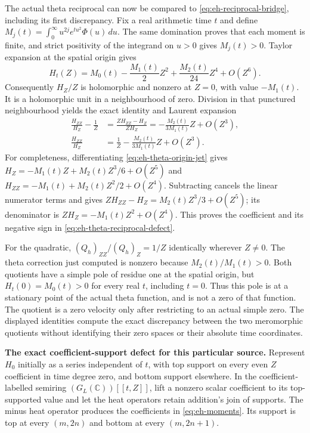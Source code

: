 \documentclass[11pt,a4paper]{article}
\theoremstyle{definition}\newtheorem{definition}[theorem]{Definition}
\begin{document}
The actual theta reciprocal can now be compared to
\eqref{eq:eh-reciprocal-bridge}, including its first discrepancy.
Fix a real arithmetic time $t$ and define
$M_j(t)=\int_0^\infty u^{2j}e^{tu^2}\Phi(u)\,du$. The same
domination proves that each moment is finite, and strict positivity
of the integrand on $u>0$ gives $M_j(t)>0$. Taylor expansion at
the spatial origin gives
\begin{equation}
 H_t(Z)=M_0(t)-\frac{M_1(t)}2Z^2
          +\frac{M_2(t)}{24}Z^4+O(Z^6).
 \label{eq:eh-theta-origin-jet}
\end{equation}
Consequently $H_Z/Z$ is holomorphic and nonzero at $Z=0$, with
value $-M_1(t)$. It is a holomorphic unit in a neighbourhood of
zero. Division in that punctured neighbourhood yields the exact
identity and Laurent expansion
\begin{align}
 \frac{H_{ZZ}}{H_Z}-\frac1Z
 &=\frac{ZH_{ZZ}-H_Z}{ZH_Z}
   =-\frac{M_2(t)}{3M_1(t)}Z+O(Z^3),
 \label{eq:eh-theta-reciprocal-defect}\\
 \frac{H_{ZZ}}{H_Z}
 &=\frac1Z-\frac{M_2(t)}{3M_1(t)}Z+O(Z^3).
 \label{eq:eh-theta-reciprocal-expansion}
\end{align}
For completeness, differentiating \eqref{eq:eh-theta-origin-jet}
gives $H_Z=-M_1(t)Z+M_2(t)Z^3/6+O(Z^5)$ and
$H_{ZZ}=-M_1(t)+M_2(t)Z^2/2+O(Z^4)$. Subtracting cancels the
linear numerator terms and gives
$ZH_{ZZ}-H_Z=M_2(t)Z^3/3+O(Z^5)$; its denominator is
$ZH_Z=-M_1(t)Z^2+O(Z^4)$. This proves the coefficient and its
negative sign in \eqref{eq:eh-theta-reciprocal-defect}.

For the quadratic, $(Q_h)_{ZZ}/(Q_h)_Z=1/Z$ identically wherever
$Z\ne0$. The theta correction just computed is nonzero because
$M_2(t)/M_1(t)>0$. Both quotients have a simple pole of residue
one at the spatial origin, but $H_t(0)=M_0(t)>0$ for every real
$t$, including $t=0$. Thus this pole is at a stationary point of
the actual theta function, and is not a zero of that function.
The quotient is a zero velocity only after restricting to an actual
simple zero. The displayed identities compute the exact discrepancy
between the two meromorphic quotients without identifying their
zero spaces or their absolute time coordinates.

\EH\textbf{The exact coefficient-support defect for this particular source.}
Represent $H_0$ initially as a series independent of $t$, with top
support on every even $Z$ coefficient in time degree zero, and bottom
support elsewhere. In the coefficient-labelled semiring
$(G_L(\mathbb C))[[t,Z]]$, lift a nonzero scalar coefficient to its
top-supported value and let the heat operators retain addition's join
of supports. The minus heat operator produces the coefficients in
\eqref{eq:eh-moments}. Its support is top at every $(m,2n)$ and bottom
at every $(m,2n+1)$.
\end{document}
